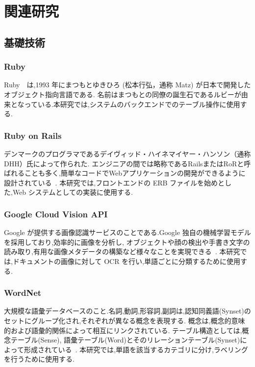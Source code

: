 \chapter{関連研究}
\label{ch:rw}

\quad

\section{基礎技術}
\label{sec:rw_basic}

\subsection{Ruby}
\label{subsec:rw_sub_ruby}
Ruby~\cite{ruby2023}~\cite{rubybook2024}は,1993 年にまつもとゆきひろ (松本行弘，通称 Matz) が日本で開発したオブジェクト指向言語である.
名前はまつもとの同僚の誕生石であるルビーが由来となっている.本研究では,システムのバックエンドでのテーブル操作に使用する.

\subsection{Ruby on {R}ails}
\label{subsec:rw_sub_rails}
デンマークのプログラマであるデイヴィッド・ハイネマイヤー・ハンソン（通称DHH）氏によって作られた.
エンジニアの間では略称であるRailsまたはRoRと呼ばれることも多く,簡単なコードでWebアプリケーションの開発ができるように設計されている~\cite{takahashi2013rails}.
本研究では,フロントエンドの ERB ファイルを始めとした,Web システムとしての実装に使用する.

\subsection{Google {C}loud {V}ision {API}}
\label{subsec:rw_sub_ocr}
Google が提供する画像認識サービスのことである.Google 独自の機械学習モデルを採用しており,効率的に画像を分析し,
オブジェクトや顔の検出や手書き文字の読み取り,有用な画像メタデータの構築など様々なことを実現できる~\cite{ohnishi2018ocr}.
本研究では,ドキュメントの画像に対して OCR を行い,単語ごとに分類するために使用する.

\subsection{Word{N}et}
\label{subsec:rw_sub_wordnet}
大規模な語彙データベースのこと.名詞,動詞,形容詞,副詞は,認知同義語(Synset)のセットにグループ化され,それぞれが異なる概念を表現する.
概念は,概念的意味的および語彙的関係によって相互にリンクされている.
テーブル構造としては,概念テーブル(Sense), 語彙テーブル(Word)とそのリレーションテーブル(Synset)によって形成されている~\cite{takeuchi2019wordnet}.
本研究では,単語を該当するカテゴリに分け,ラベリングを行うために使用する.

